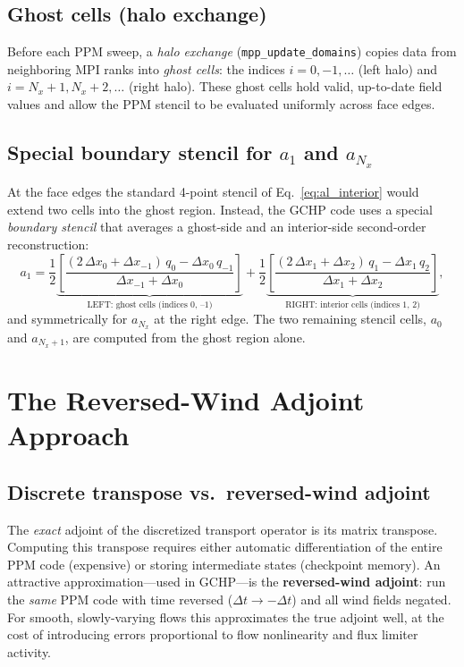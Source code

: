 \documentclass[11pt]{article}
\begin{document}
\subsection{Ghost cells (halo exchange)}

Before each PPM sweep, a \emph{halo exchange} (\texttt{mpp\_update\_domains})
copies data from neighboring MPI ranks into \emph{ghost cells}: the indices
$i = 0, -1, \ldots$ (left halo) and $i = N_x+1, N_x+2, \ldots$ (right halo).
These ghost cells hold valid, up-to-date field values and allow the PPM
stencil to be evaluated uniformly across face edges.

\subsection{Special boundary stencil for \texorpdfstring{$a_1$}{a(1)} and \texorpdfstring{$a_{N_x}$}{a(Nx)}}

At the face edges the standard 4-point stencil of Eq.~\eqref{eq:al_interior}
would extend two cells into the ghost region. Instead, the GCHP code uses a
special \emph{boundary stencil} that averages a ghost-side and an
interior-side second-order reconstruction:
\begin{equation}
  a_1 = \frac{1}{2}\underbrace{\left[
    \frac{(2\,\Delta x_0 + \Delta x_{-1})\,q_0 - \Delta x_0\,q_{-1}}
         {\Delta x_{-1} + \Delta x_0}
  \right]}_{\text{LEFT: ghost cells (indices 0, --1)}}
  + \frac{1}{2}\underbrace{\left[
    \frac{(2\,\Delta x_1 + \Delta x_2)\,q_1 - \Delta x_1\,q_2}
         {\Delta x_1 + \Delta x_2}
  \right]}_{\text{RIGHT: interior cells (indices 1, 2)}},
  \label{eq:al1_boundary}
\end{equation}
and symmetrically for $a_{N_x}$ at the right edge. The two remaining
stencil cells, $a_0$ and $a_{N_x+1}$, are computed from the ghost region
alone.

\section{The Reversed-Wind Adjoint Approach}

\subsection{Discrete transpose vs.\ reversed-wind adjoint}

The \emph{exact} adjoint of the discretized transport operator is its
matrix transpose. Computing this transpose requires either automatic
differentiation of the entire PPM code (expensive) or storing intermediate
states (checkpoint memory). An attractive approximation---used in GCHP---is
the \textbf{reversed-wind adjoint}: run the \emph{same} PPM code with
time reversed ($\Delta t \to -\Delta t$) and all wind fields negated. For
smooth, slowly-varying flows this approximates the true adjoint well, at
the cost of introducing errors proportional to flow nonlinearity and flux
limiter activity.
\end{document}
